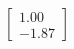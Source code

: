 \documentclass[preview]{standalone}
\begin{document}
\begin{align*}
\begin{bmatrix} 1.00 \\ -1.87 \end{bmatrix}
\end{align*}
\end{document}
